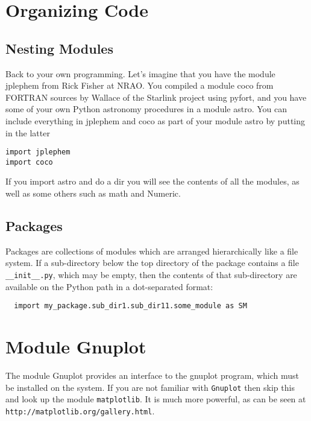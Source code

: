 \documentclass{article}
\begin{document}
\section{Organizing Code}

\subsection{Nesting Modules}

Back to your own programming.  Let's imagine that you have the module
{\ttfamily jplephem} from Rick Fisher at NRAO.  You compiled a module
{\ttfamily coco} from FORTRAN sources by Wallace of the Starlink project
using {\ttfamily pyfort},
and you have some of your own Python astronomy procedures in a module
{\ttfamily astro}. You can include everything in  {\ttfamily jplephem} and
{\ttfamily coco} as part of your module {\ttfamily astro} by putting
in the latter
\begin{verbatim}
import jplephem
import coco
\end{verbatim}
If you import {\ttfamily astro} and do a {\ttfamily dir{}} you will see
the contents of all the modules, as well as some others such as
{\ttfamily math} and {\ttfamily Numeric}.

\subsection{Packages}

Packages are collections of modules which are arranged hierarchically like a
file system.  If a sub-directory below the top directory of the package
contains a file {\tt \_\_init\_\_.py}, which may be empty, then the contents of
that sub-directory are available on the Python path in a dot-separated
format:
\begin{verbatim}
  import my_package.sub_dir1.sub_dir11.some_module as SM
\end{verbatim}


\appendix

\newpage
\section{Module {\ttfamily Gnuplot}}

The module {\ttfamily Gnuplot} provides an interface to the {\ttfamily gnuplot}
program, which must be installed on the system.  If you are not familiar with
{\tt Gnuplot} then skip this and look up the module {\tt matplotlib}.  It is
much more powerful, as can be seen at {\tt http://matplotlib.org/gallery.html}.
\end{document}
